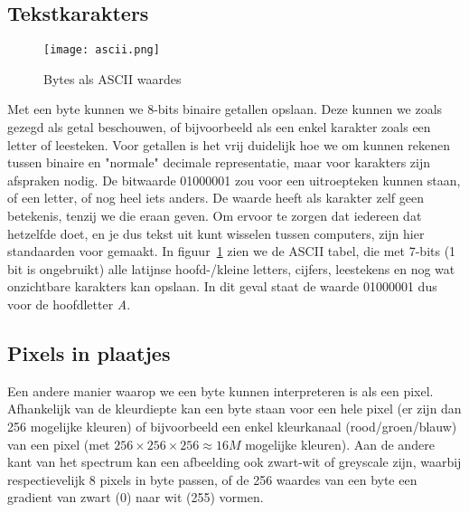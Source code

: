 

\subsection{Tekstkarakters}

\begin{figure}[ht]
    \centering
    \texttt{[image: ascii.png]}
    \caption{Bytes als ASCII waardes}
    \label{fig:ascii}
\end{figure}

Met een byte kunnen we 8-bits binaire getallen opslaan. Deze kunnen we zoals gezegd als getal beschouwen, of bijvoorbeeld als een enkel karakter zoals een letter of leesteken. Voor getallen is het vrij duidelijk hoe we om kunnen rekenen tussen binaire en "normale" decimale representatie, maar voor karakters zijn afspraken nodig. De bitwaarde 01000001 zou voor een uitroepteken kunnen staan, of een letter, of nog heel iets anders. De waarde heeft als karakter zelf geen betekenis, tenzij we die eraan geven. Om ervoor te zorgen dat iedereen dat hetzelfde doet, en je dus tekst uit kunt wisselen tussen computers, zijn hier standaarden voor gemaakt. In figuur~\ref{fig:ascii} zien we de ASCII tabel, die met 7-bits (1 bit is ongebruikt) alle latijnse hoofd-/kleine letters, cijfers, leestekens en nog wat onzichtbare karakters kan opslaan. In dit geval staat de waarde 01000001 dus voor de hoofdletter \emph{A}.

\subsection{Pixels in plaatjes}
Een andere manier waarop we een byte kunnen interpreteren is als een pixel. Afhankelijk van de kleurdiepte kan een byte staan voor een hele pixel (er zijn dan 256 mogelijke kleuren) of bijvoorbeeld een enkel kleurkanaal (rood/groen/blauw) van een pixel (met $256 \times 256 \times 256 \approx 16M$ mogelijke kleuren). Aan de andere kant van het spectrum kan een afbeelding ook zwart-wit of greyscale zijn, waarbij respectievelijk 8 pixels in byte passen, of de 256 waardes van een byte een gradient van zwart (0) naar wit (255) vormen.

